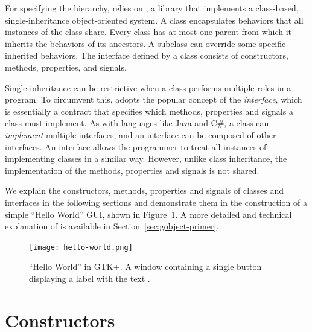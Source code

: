 For specifying the hierarchy,  relies on , a
 library that implements a class-based, single-inheritance
object-oriented system. A  class encapsulates behaviors
that all instances of the class share. Every class has at most one
parent from which it inherits the behaviors of its ancestors. A
subclass can override some specific inherited behaviors. The interface
defined by a class consists of constructors, methods, properties,
and signals. 

Single inheritance can be restrictive when a class performs multiple
roles in a program. To circumvent this,  adopts the popular
concept of the \textit{interface}, which is essentially a contract
that specifies which methods, properties and signals a class must
implement. As with languages like Java and C#, a class can
\textit{implement} multiple interfaces, and an interface can be
composed of other interfaces. An interface allows the programmer to
treat all instances of implementing classes in a similar way. However,
unlike class inheritance, the implementation of the methods,
properties and signals is not shared.

We explain the constructors, methods, properties and signals of
classes and interfaces in the following sections and demonstrate them
in the construction of a simple ``Hello World'' GUI, shown in
Figure~\ref{fig:hello-world}. A more detailed and technical
explanation of  is available in
Section~\ref{sec:gobject-primer}.

\begin{figure}[h!tbp]
  \begin{center}
    \texttt{[image: hello-world.png]}
    \caption{\label{fig:hello-world}``Hello World'' in GTK+. 
      A window containing a single button displaying a label with the text
      .}
  \end{center}
\end{figure}

\section{Constructors}

